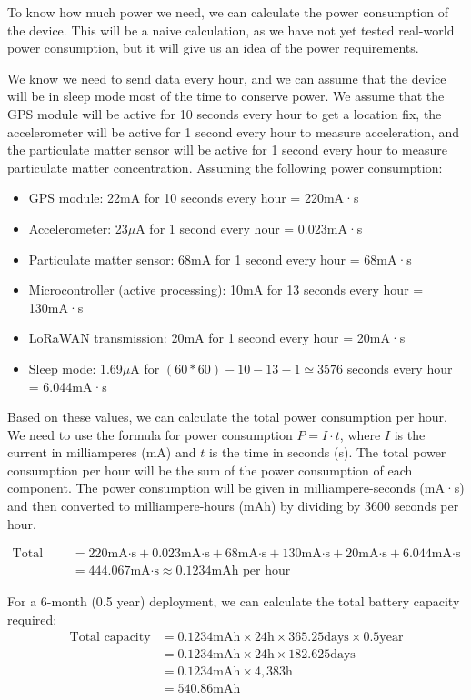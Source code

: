 To know how much power we need, we can calculate the power consumption of the device. This will be a naive calculation, as we have not yet tested real-world power consumption, but it will give us an idea of the power requirements.

We know we need to send data every hour, and we can assume that the device will be in sleep mode most of the time to conserve power.
We assume that the GPS module will be active for 10 seconds every hour to get a location fix, the accelerometer will be active for 1 second every hour to measure acceleration, and the particulate matter sensor will be active for 1 second every hour to measure particulate matter concentration.
Assuming the following power consumption:
\begin{itemize}  \item GPS module: 22mA for 10 seconds every hour = 220mA·s
  \item Accelerometer: 23$\mu$A for 1 second every hour = 0.023mA·s
  \item Particulate matter sensor: 68mA for 1 second every hour = 68mA·s
  \item Microcontroller (active processing): 10mA for 13 seconds every hour = 130mA·s
  \item LoRaWAN transmission: 20mA for 1 second every hour = 20mA·s
  \item Sleep mode: 1.69$\mu$A for $(60*60) - 10 - 13 - 1 \simeq 3576$ seconds every hour = 6.044mA·s
\end{itemize}

Based on these values, we can calculate the total power consumption per hour.
We need to use the formula for power consumption $P = I \cdot t$, where $I$ is the current in milliamperes (mA) and $t$ is the time in seconds (s). The total power consumption per hour will be the sum of the power consumption of each component. The power consumption will be given in milliampere-seconds (mA·s) and then converted to milliampere-hours (mAh) by dividing by 3600 seconds per hour.

\begin{align*}
\text{Total per hour} &= 220\text{mA·s} + 0.023\text{mA·s} + 68\text{mA·s} + 130\text{mA·s} + 20\text{mA·s} + 6.044\text{mA·s} \\
&= 444.067\text{mA·s} \approx 0.1234\text{mAh per hour}
\end{align*}

For a 6-month (0.5 year) deployment, we can calculate the total battery capacity required:
\begin{align*}
\text{Total capacity} &= 0.1234\text{mAh} \times 24\text{h} \times 365.25\text{days} \times 0.5\text{year} \\
&= 0.1234\text{mAh} \times 24\text{h} \times 182.625\text{days} \\
&= 0.1234\text{mAh} \times 4,383\text{h} \\
&= 540.86\text{mAh}
\end{align*}

